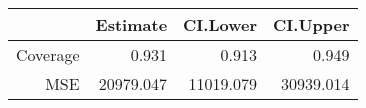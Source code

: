 \begin{table}[ht]
\centering
\begin{tabular}{rrrr}
  \hline
 & Estimate & CI.Lower & CI.Upper \\ 
  \hline
Coverage & 0.931 & 0.913 & 0.949 \\ 
  MSE & 20979.047 & 11019.079 & 30939.014 \\ 
   \hline
\end{tabular}
\end{table}
